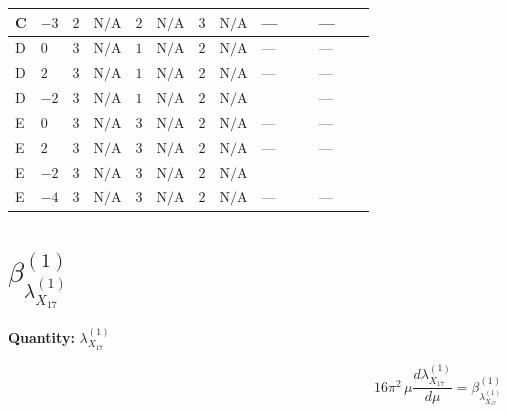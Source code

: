 \documentclass[8pt]{article}
\begin{document}
\begin{landscape}
\begin{longtable}{@{}llcccccc >{\raggedright\arraybackslash}p{0.21\linewidth} >{\raggedright\arraybackslash}p{0.21\linewidth}@{}}
\midrule
C & $-3$ & $2$ & $\text{N/A}$ & $2$ & $\text{N/A}$ & $3$ & $\text{N/A}$ & --- & --- \\
\midrule
D & $0$ & $3$ & $\text{N/A}$ & $1$ & $\text{N/A}$ & $2$ & $\text{N/A}$ & --- & --- \\
\midrule
D & $2$ & $3$ & $\text{N/A}$ & $1$ & $\text{N/A}$ & $2$ & $\text{N/A}$ & --- & --- \\
\midrule
D & $-2$ & $3$ & $\text{N/A}$ & $1$ & $\text{N/A}$ & $2$ & $\text{N/A}$ & \scriptsize\adjustbox{max width=\linewidth}{$\begin{gathered} +12 {\lambda_5} {\lambda_{X_{12}}}\end{gathered}$} & --- \\
\midrule
E & $0$ & $3$ & $\text{N/A}$ & $3$ & $\text{N/A}$ & $2$ & $\text{N/A}$ & --- & --- \\
\midrule
E & $2$ & $3$ & $\text{N/A}$ & $3$ & $\text{N/A}$ & $2$ & $\text{N/A}$ & --- & --- \\
\midrule
E & $-2$ & $3$ & $\text{N/A}$ & $3$ & $\text{N/A}$ & $2$ & $\text{N/A}$ & \scriptsize\adjustbox{max width=\linewidth}{$\begin{gathered} +4 {\lambda_5} {\lambda_{X_{12}}}\end{gathered}$} & \scriptsize\adjustbox{max width=\linewidth}{$\begin{gathered} +{\lambda_{HS_1}^{(1)}} (6 {\lambda_{X_{7}}^{(1)}}+2 {\lambda_{X_{7}}^{(2)}})\end{gathered}$} \\
\midrule
E & $-4$ & $3$ & $\text{N/A}$ & $3$ & $\text{N/A}$ & $2$ & $\text{N/A}$ & --- & --- \\
\midrule
\bottomrule
\end{longtable}
\clearpage
\section*{$\beta_{{\lambda_{X_{17}}^{(1)}}}^{(1)}$}
\noindent\textbf{Quantity: }${\lambda_{X_{17}}^{(1)}}$\par\smallskip
\[16\pi^2\,\mu\frac{d {\lambda_{X_{17}}^{(1)}}}{d\mu}=\beta_{{\lambda_{X_{17}}^{(1)}}}^{(1)}\]

\end{landscape}
\end{document}
